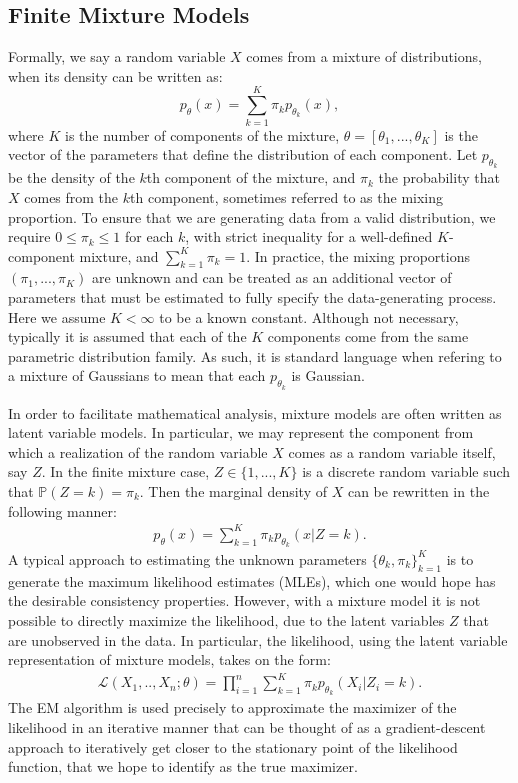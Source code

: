 \documentclass[runningheads]{llncs}
\begin{document}
\subsection{Finite Mixture Models}\label{sec:fmms}
Formally, we say a random variable $X$ comes from a mixture of distributions,
when its density can be written as:
\[
p_{\mathbb{\theta}}(x) = \sum_{k=1}^K \pi_k p_{\theta_k}(x),
\]
where $K$ is the number of components of the mixture, $\mathbb{\theta}
= [\theta_1,...,\theta_K]$ is the vector of the parameters that define the
distribution of each component. Let
$p_{\theta_k}$ be the density of the $k$th component of the mixture,
and $\pi_k$ the probability that $X$ comes from the $k$th component, sometimes
referred to as the mixing proportion. To ensure that we are generating data from
a valid distribution, we require $0 \leq \pi_k \leq 1$ for each $k$, with strict
inequality for a well-defined $K$-component mixture, and $\sum_{k=1}^K \pi_k =
1$. In practice, the mixing proportions $(\pi_1,...,\pi_K)$ are unknown and can
be treated as an additional vector of parameters that must be estimated to fully specify the
data-generating process. Here we assume $K < \infty$ to be a known constant.
Although not necessary, typically it is assumed that each of the
$K$ components come from the same parametric distribution family. As such, it is
standard language when refering to a mixture of Gaussians to mean that each
$p_{\theta_k}$ is Gaussian.

In order to facilitate mathematical analysis, mixture models are often written as latent
variable models. In particular, we may represent the component from which a
realization of the random variable $X$ comes as a random variable itself, say
$Z$. In the finite mixture case, $Z \in \{1,...,K\}$ is a discrete random
variable such that $\mathbb{P}(Z=k) = \pi_k$. Then the marginal density of $X$
can be rewritten in the following manner:
\begin{align*}
p_{\mathbb{\theta}}(x) = \sum_{k=1}^K \pi_k p_{\theta_k}(x|Z=k).
\end{align*}
A typical approach to estimating the unknown parameters $\{\theta_k,
\pi_k\}_{k=1}^K$ is to generate the maximum likelihood estimates (MLEs), which
one would hope has the desirable consistency properties.
However, with a mixture model it is not possible to directly maximize the
likelihood, due to the latent variables $Z$ that are unobserved in the data.
In particular, the likelihood, using the latent variable representation of mixture
models, takes on the form:
\begin{align*}
\mathcal{L}(X_1,..,X_n; \theta) = \prod_{i=1}^n\sum_{k=1}^K \pi_k p_{\theta_k}(X_i|Z_i=k).
\end{align*}
The EM algorithm is used precisely to approximate the maximizer of the likelihood
in an iterative manner that can be thought of as a gradient-descent approach to
iteratively get closer to the stationary point of the likelihood function,
that we hope to identify as the true maximizer.
\end{document}
